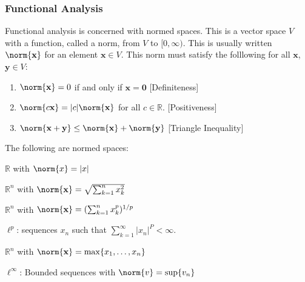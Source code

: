 \documentclass[crop=false,class=article,oneside]{standalone}
\begin{document}
    \subsubsection{Functional Analysis}
        Functional analysis is concerned with normed spaces.
        This is a vector space $V$ with a function, called
        a norm, from $V$ to $[0,\infty)$. This is usually
        written $\norm{\mathbf{x}}$ for an element
        $\mathbf{x}\in{V}$. This norm must satisfy the
        folllowing for all $\mathbf{x}$, $\mathbf{y}\in{V}$:
        \begin{enumerate}
            \item $\norm{\mathbf{x}}=0$ if and only
                  if $\mathbf{x}=\mathbf{0}$
                  \hfill[Definiteness]
            \item $\norm{c\mathbf{x}}=|c|\norm{\mathbf{x}}$
                  for all $c\in\mathbb{R}$.
                  \hfill[Positiveness]
            \item $\norm{\mathbf{x}+\mathbf{y}}%
                   \leq\norm{\mathbf{x}}+\norm{\mathbf{y}}$
                  \hfill[Triangle Inequality]
        \end{enumerate}
        \begin{example}
            The following are normed spaces:
            \begin{enumerate}
                \begin{multicols}{2}
                    \item $\mathbb{R}$ with $\norm{x}=|x|$
                    \item $\mathbb{R}^{n}$ with
                          $\norm{\mathbf{x}}%
                           =\sqrt{\sum_{k=1}^{n}x_{k}^{2}}$
                    \item $\mathbb{R}^{n}$ with
                          $\norm{\mathbf{x}}%
                           =(\sum_{k=1}^{n}x_{k}^{p})^{1/p}$
                    \item $\ell^{p}$: sequences $x_{n}$
                          such that
                          $\sum_{k=1}^{\infty}|x_{n}|^P%
                           <\infty$.
                    \item $\mathbb{R}^{n}$ with
                          $\norm{\mathbf{x}}%
                           =\max\{x_{1},\hdots,x_{n}\}$
                    \item $\ell^{\infty}$: Bounded sequences
                          with $\norm{v}=\sup\{v_{n}\}$
                \end{multicols}
            \end{enumerate}
        \end{example}
\end{document}
